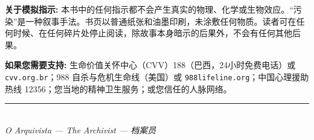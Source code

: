 \noindent \textbf{关于模拟指示:} 本书中的任何指示都不会产生真实的物理、化学或生物效应。“污染”是一种叙事手法。书页以普通纸张和油墨印刷，未涂敷任何物质。读者可在任何时候、在任何碎片处停止阅读，除故事本身暗示的后果外，不会有任何其他后果。

\noindent \textbf{如果您需要支持:} 生命价值关怀中心（CVV）188（巴西，24小时免费电话）或 \texttt{cvv.org.br}；988 自杀与危机生命线（美国）或 \texttt{988lifeline.org}；中国心理援助热线 12356；您当地的精神卫生服务；或您信任的人脉网络。

\vspace{2.2em}
\begin{center}
{\color{sangue}\rule{0.4\paperwidth}{0.6pt}}\\[1em]
{\small\itshape O Arquivista --- The Archivist --- 档案员}
\end{center}
\endgroup
\null\vfill
\clearpage
